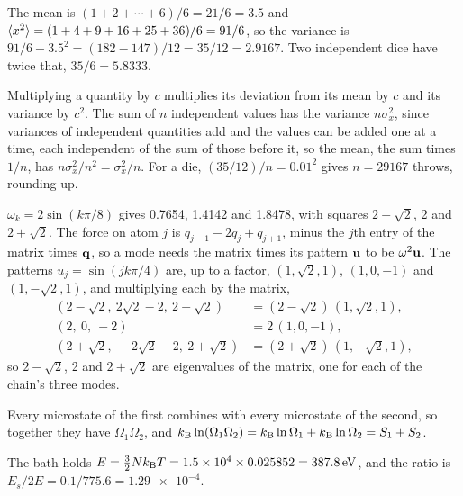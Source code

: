 \label{sec:sm-solutions}

The mean is $(1 + 2 + \dotsb + 6)/6 = 21/6 = 3.5$
and $\langle x^2 \rangle = (1 + 4 + 9 + 16 + 25 + 36)/6 = 91/6$, so the variance is
$91/6 - 3.5^2 = (182 - 147)/12 = 35/12 = 2.9167$. Two independent dice
have twice that, $35/6 = 5.8333$.

Multiplying a quantity by $c$ multiplies its
deviation from its mean by $c$ and its variance by $c^2$. The sum of $n$
independent values has the variance $n\sigma_x^2$, since variances of
independent quantities add and the values can be added one at a time,
each independent of the sum of those before it, so the mean, the sum times $1/n$, has
$n\sigma_x^2/n^2 = \sigma_x^2/n$. For a die, $(35/12)/n = 0.01^2$ gives $n
= \num{29167}$ throws, rounding up.

$\omega_k = 2\sin(k\pi/8)$ gives 0.7654, 1.4142
and 1.8478, with squares $2 - \sqrt2$, 2 and $2 + \sqrt2$. The force on
atom $j$ is $q_{j-1} - 2q_j + q_{j+1}$, minus the $j$th entry of the
matrix times $\bm{\mathrm{q}}$, so a mode needs the matrix times its pattern
$\bm{\mathrm{u}}$ to be $\omega^2\bm{\mathrm{u}}$. The patterns $u_j = \sin(jk\pi/4)$ are,
up to a factor, $(1, \sqrt2, 1)$, $(1, 0, -1)$ and $(1, -\sqrt2, 1)$, and
multiplying each by the matrix,
\begin{align*}
   (2 - \sqrt2,\ 2\sqrt2 - 2,\ 2 - \sqrt2) &= (2 - \sqrt2)\,(1, \sqrt2, 1) ,\\
   (2,\ 0,\ -2) &= 2\,(1, 0, -1) ,\\
   (2 + \sqrt2,\ -2\sqrt2 - 2,\ 2 + \sqrt2) &= (2 + \sqrt2)\,(1, -\sqrt2, 1) ,
\end{align*}
so $2 - \sqrt2$, 2 and $2 + \sqrt2$ are eigenvalues of the matrix, one for
each of the chain's three modes.

Every microstate of the first combines with
every microstate of the second, so together they have $\Omega_1\Omega_2$,
and $k_{\mathrm{B}}\ln(\Omega_1\Omega_2) = k_{\mathrm{B}}\ln\Omega_1 + k_{\mathrm{B}}\ln\Omega_2 = S_1 +
S_2$.

The bath holds $E = \frac32Nk_{\mathrm{B}} T = 1.5\times10^4
\times0.025852 = \SI{387.8}{\electronvolt}$, and the ratio is
$E_s/2E = 0.1/775.6 = \num{1.29e-4}$.


